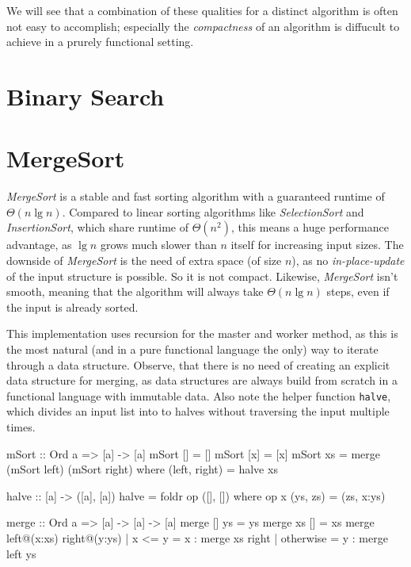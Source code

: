 We will see that a combination of these qualities for a distinct algorithm is often not easy to accomplish; especially the \emph{compactness} of an algorithm is diffucult to achieve in a prurely functional setting.

\section{Binary Search}

\section{MergeSort}

\emph{MergeSort} is a stable and fast sorting algorithm with a guaranteed runtime of $\Theta (n \lg n)$.
Compared to linear sorting algorithms like \emph{SelectionSort} and \emph{InsertionSort}, which share runtime of $\Theta (n^2)$, this means a huge performance advantage, as $\lg n$ grows much slower than $n$ itself for increasing input sizes.  
The downside of \emph{MergeSort} is the need of extra space (of size $n$), as no \emph{in-place-update} of the input structure is possible. So it is not compact. Likewise, \emph{MergeSort} isn't smooth, meaning that the algorithm will always take $\Theta (n \lg n)$ steps, even if the input is already sorted.

\begin{impl} \label{impl:mshaskell}
This implementation uses recursion for the master and worker method, as this is the most natural (and in a pure functional language the only) way to iterate through a data structure.
Observe, that there is no need of creating an explicit data structure for merging, as data structures are always build from scratch in a functional language with immutable data.
Also note the helper function \texttt{halve}, which divides an input list into to halves without traversing the input multiple times.
\end{impl}

\begin{haskellcode}
  mSort :: Ord a => [a] -> [a]
  mSort [] = []
  mSort [x] = [x]
  mSort xs = merge (mSort left) (mSort right)
             where (left, right) = halve xs

  halve :: [a] -> ([a], [a])
  halve = foldr op ([], []) where op x (ys, zs) = (zs, x:ys)

  merge :: Ord a => [a] -> [a] -> [a]
  merge [] ys = ys
  merge xs [] = xs
  merge left@(x:xs) right@(y:ys)
      | x <= y    = x : merge xs right
      | otherwise = y : merge left ys
\end{haskellcode}

